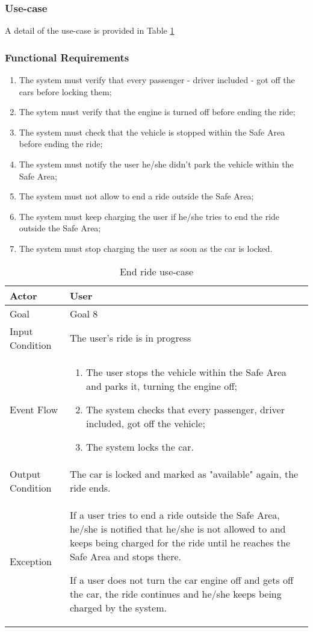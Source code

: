 \subsubsection{Use-case}
A detail of the use-case is provided in Table \ref{end_ride_uc}

\subsubsection{Functional Requirements}
\begin{enumerate}
\item The system must verify that every passenger - driver included - got off the cars before locking them;
\item The sytem must verify that the engine is turned off before ending the ride;
\item The system must check that the vehicle is stopped within the Safe Area before ending the ride;
\item The system must notify the user he/she didn't park the vehicle within the Safe Area;
\item The system must not allow to end a ride outside the Safe Area;
\item The system must keep charging the user if he/she tries to end the ride outside the Safe Area;
\item The system must stop charging the user as soon as the car is locked.
\end{enumerate}

\begin{table}[H]
\begin{center}
\begin{tabular}{p{} | p{}}
\hline
Actor & User\\
\hline
Goal & Goal 8\\
\hline
Input Condition & The user's ride is in progress\\
\hline
Event Flow & 
\begin{enumerate}
\item The user stops the vehicle within the Safe Area and parks it, turning the engine off;
\item The system checks that every passenger, driver included, got off the vehicle;
\item The system locks the car.
\end{enumerate} \\
\hline
Output Condition & The car is locked and marked as "available" again, the ride ends.\\
\hline
Exception & If a user tries to end a ride outside the Safe Area, he/she is notified that he/she is not allowed to and keeps being charged for the ride until he reaches the Safe Area and stops there.

If a user does not turn the car engine off and gets off the car, the ride continues and he/she keeps being charged by the system.\\
\hline
\end{tabular}
\end{center}
\caption{End ride use-case}
\label{end_ride_uc}
\end{table}
